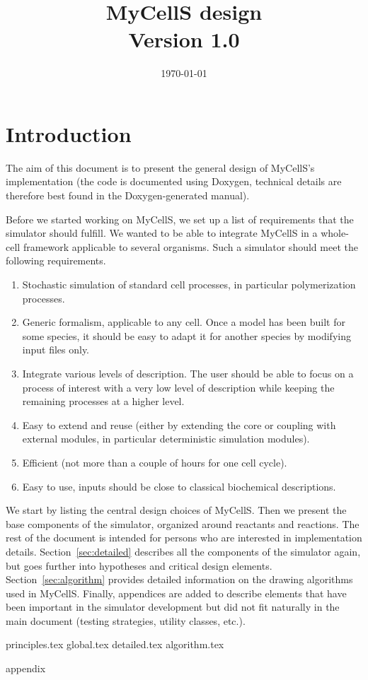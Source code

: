 \documentclass[12pt]{scrartcl}
\theoremstyle{definition}
\theoremstyle{remark}
\numberwithin{equation}{section}
\begin{document}
\title{MyCellS design \\ Version 1.0}%
\date{\today}%
\maketitle

\newpage

\tableofcontents

\newpage

\section{Introduction}

The aim of this document is to present the general design of MyCellS's implementation
(the code is documented using Doxygen, technical details are therefore best found in the Doxygen-generated manual).

Before we started working on MyCellS,
we set up a list of requirements that the simulator should fulfill.
We wanted to be able to integrate MyCellS in a whole-cell framework
applicable to several organisms.
Such a simulator should meet the following requirements.
\begin{enumerate}
  \item Stochastic simulation of standard cell processes,
  in particular polymerization processes.
\label{itm:stochastic_processes}
  \item Generic formalism, applicable to any cell.
  Once a model has been built for some species, it should be easy to adapt it
  for another species by modifying input files only.
\label{itm:generic_formalism}
  \item Integrate various levels of description.
  The user should be able to focus on a process of interest
  with a very low level of description
  while keeping the remaining processes at a higher level.
\label{itm:granularity}
  \item Easy to extend and reuse
  (either by extending the core or coupling with external modules,
  in particular deterministic simulation modules).
\label{itm:extendable}
  \item Efficient (not more than a couple of hours for one cell cycle).
\label{itm:efficiency}
  \item Easy to use, inputs should be close to classical biochemical
  descriptions.
\label{itm:simple_inputs}
\end{enumerate}

We start by listing the central design choices of MyCellS.
Then we present the base components of the simulator, organized around reactants and reactions.
The rest of the document is intended for persons who are interested in implementation details.
Section~\ref{sec:detailed} describes all the components of the simulator again,
but goes further into hypotheses and critical design elements.
Section~\ref{sec:algorithm} provides detailed information
on the drawing algorithms used in MyCellS.
Finally, appendices are added to describe elements that have been important
in the simulator development but did not fit naturally in the main document
(testing strategies, utility classes, etc.).

{principles.tex}
{global.tex}
{detailed.tex}
{algorithm.tex}
\clearpage

\appendix
{appendix}
\clearpage



\end{document}
